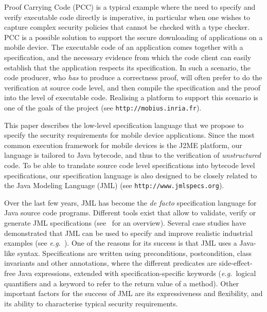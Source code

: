 Proof Carrying Code (PCC) is a typical example where the need to
specify and verify executable code directly is imperative, in
particular when one wishes to capture complex security policies that
cannot be checked with a type checker.  PCC is a possible solution to
support the secure downloading of applications on a mobile device. The
executable code of an application comes together with a specification,
and the necessary evidence from which the code client can easily
establish that the application respects its specification. In such a
scenario, the code producer, who \emph{has} to produce a correctness
proof, will often prefer to do the verification at source code level,
and then compile the specification and the proof into the level of
executable code. Realising a platform to support this scenario is one
of the goals of the \mobius project (see
\texttt{http://mobius.inria.fr}).

This paper describes the low-level specification language that we
propose to specify the security requirements for mobile device
applications. Since the most common execution framework for mobile
devices is the J2ME platform, our language is tailored to Java
bytecode, and thus to the verification of \emph{unstructured}
code. To be able to translate source code level specifications
into bytecode level specifications, our specification language is also
designed to be closely related to the Java Modeling Language (JML)
(see
\texttt{http://www.jmlspecs.org}).


Over the last few years, JML has become the \emph{de facto}
specification language for Java source code programs. Different tools
exist that allow to validate, verify or generate JML specifications
(see~\cite{BurdyCCEKLLP05} for an overview). Several case studies have
demonstrated that JML can be used to specify and improve realistic
industrial examples (see \emph{e.g.}~\cite{BreunesseCHJ04}). One of
the reasons for its success is that JML uses a Java-like
syntax. Specifications are written using preconditions, postcondition,
class invariants and other annotations, where the different predicates
are side-effect-free Java expressions, extended with
specification-specific keywords (\emph{e.g.}\ logical quantifiers and
a keyword to refer to the return value of a method). Other important
factors for the success of JML are its expressiveness and flexibility,
and its ability to characterise typical security requirements.



